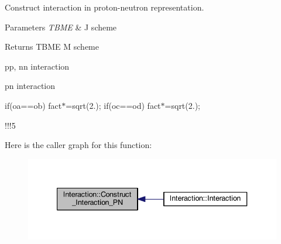 Construct interaction in proton-\/neutron representation. 


\begin{DoxyParams}{Parameters}
{\em T\-B\-M\-E} & J scheme \\
\hline
\end{DoxyParams}
\begin{DoxyReturn}{Returns}
T\-B\-M\-E M scheme 
\end{DoxyReturn}
pp, nn interaction

pn interaction

if(oa==ob) fact$\ast$=sqrt(2.); if(oc==od) fact$\ast$=sqrt(2.);

!!!5 

Here is the caller graph for this function\-:
\nopagebreak
\begin{figure}[H]
\begin{center}
\leavevmode
\includegraphics[width=340pt]{class_interaction_a42aceecb46825fe9c78b71a00f888206_icgraph}
\end{center}
\end{figure}


